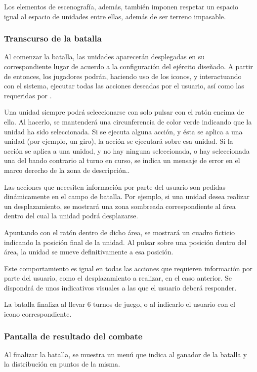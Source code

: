 Los elementos de escenografía, además, también imponen respetar un
espacio igual al espacio de unidades entre ellas, además de ser terreno impasable.

\subsubsection*{Transcurso de la batalla}
Al comenzar la batalla, las unidades aparecerán desplegadas en su
correspondiente lugar de acuerdo a la configuración del ejército
diseñado. A partir de entonces, los jugadores podrán, haciendo uso de
los iconos, y interactuando con el sistema, ejecutar todas las
acciones deseadas por el usuario, así como las requeridas por \gomf.

Una unidad siempre podrá seleccionarse con solo pulsar con el ratón
encima de ella. Al hacerlo, se mantenderá una circunferencia de color verde indicando que la unidad ha sido
seleccionada. Si se ejecuta alguna acción, y ésta se aplica a una
unidad (por ejemplo, un giro), la acción se ejecutará sobre esa
unidad. Si la acción se aplica a una unidad, y no hay ninguna
seleccionada, o hay seleccionada una del bando contrario al turno en
curso, se indica un mensaje de error en el marco derecho de la zona de
descripción..

Las acciones que necesiten información por parte del usuario son
pedidas dinámicamente en el campo de batalla. Por ejemplo, si una
unidad desea realizar un desplazamiento, se mostrará una zona
sombreada correspondiente al área dentro del cual la unidad podrá
desplazarse.

Apuntando con el ratón dentro de dicho área, se mostrará un cuadro
ficticio indicando la posición final de la unidad. Al pulsar sobre una
posición dentro del área, la unidad se mueve definitivamente a esa
posición.

Este comportamiento es igual en todas las acciones que
requieren información por parte del usuario, como el desplazamiento a
realizar, en el caso anterior. Se dispondrá de unos indicativos
visuales a las que el usuario deberá responder.

La batalla finaliza al llevar 6 turnos de juego, o al indicarlo el
usuario con el icono correspondiente.

\subsubsection*{Pantalla de resultado del combate}
Al finalizar la batalla, se muestra un menú que indica al ganador de
la batalla y la distribución en puntos de la misma.


